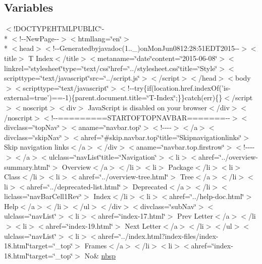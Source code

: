 \subsection*{Variables}
\begin{DoxyCompactItemize}
\item 
$<$!D\-O\-C\-T\-Y\-P\-E\-H\-T\-M\-L\-P\-U\-B\-L\-I\-C\char`\"{}-\/\\*
$<$!-\/-\/New\-Page-\/-\/$>$$<$htmllang=\char`\"{}en\char`\"{}$>$\\*
$<$head$>$$<$!-\/-\/Generatedbyjavadoc(1..\-\_)on\-Mon\-Jun0812\-:28\-:51\-E\-D\-T2015-\/-\/$>$$<$title$>$ T Index$<$/title$>$$<$metaname=\char`\"{}date\char`\"{}content=\char`\"{}2015-\/06-\/08\char`\"{}$>$$<$linkrel=\char`\"{}stylesheet\char`\"{}type=\char`\"{}text/css\char`\"{}href=\char`\"{}../stylesheet.\-css\char`\"{}title=\char`\"{}\-Style\char`\"{}$>$$<$scripttype=\char`\"{}text/javascript\char`\"{}src=\char`\"{}../script.\-js\char`\"{}$>$$<$/script$>$$<$/head$>$$<$body$>$$<$scripttype=\char`\"{}text/javascript\char`\"{}$>$$<$!-\/-\/try\{if(location.\-href.\-index\-Of('is-\/external=true')==-\/1)\{parent.\-document.\-title=\char`\"{}\-T-\/\-Index\char`\"{};\}\}catch(err)\{\}$<$/script$>$$<$noscript$>$$<$div$>$ Java\-Script is disabled on your browser$<$/div$>$$<$/noscript$>$$<$!-\/-\/=========\-S\-T\-A\-R\-T\-O\-F\-T\-O\-P\-N\-A\-V\-B\-A\-R=======-\/-\/$>$$<$divclass=\char`\"{}top\-Nav\char`\"{}$>$$<$aname=\char`\"{}navbar.\-top\char`\"{}$>$$<$!-\/-\/-\/-\/$>$$<$/a$>$$<$divclass=\char`\"{}skip\-Nav\char`\"{}$>$$<$ahref=\char`\"{}\#skip.\-navbar.\-top\char`\"{}title=\char`\"{}\-Skipnavigationlinks\char`\"{}$>$ Skip navigation links$<$/a$>$$<$/div$>$$<$aname=\char`\"{}navbar.\-top.\-firstrow\char`\"{}$>$$<$!-\/-\/-\/-\/$>$$<$/a$>$$<$ulclass=\char`\"{}nav\-List\char`\"{}title=\char`\"{}\-Navigation\char`\"{}$>$$<$li$>$$<$ahref=\char`\"{}../overview-\/summary.\-html\char`\"{}$>$ Overview$<$/a$>$$<$/li$>$$<$li$>$ Package$<$/li$>$$<$li$>$ Class$<$/li$>$$<$li$>$$<$ahref=\char`\"{}../overview-\/tree.\-html\char`\"{}$>$ Tree$<$/a$>$$<$/li$>$$<$li$>$$<$ahref=\char`\"{}../deprecated-\/list.\-html\char`\"{}$>$ Deprecated$<$/a$>$$<$/li$>$$<$liclass=\char`\"{}nav\-Bar\-Cell1\-Rev\char`\"{}$>$ Index$<$/li$>$$<$li$>$$<$ahref=\char`\"{}../help-\/doc.\-html\char`\"{}$>$ Help$<$/a$>$$<$/li$>$$<$/ul$>$$<$/div$>$$<$divclass=\char`\"{}sub\-Nav\char`\"{}$>$$<$ulclass=\char`\"{}nav\-List\char`\"{}$>$$<$li$>$$<$ahref=\char`\"{}index-\/17.\-html\char`\"{}$>$ Prev Letter$<$/a$>$$<$/li$>$$<$li$>$$<$ahref=\char`\"{}index-\/19.\-html\char`\"{}$>$ Next Letter$<$/a$>$$<$/li$>$$<$/ul$>$$<$ulclass=\char`\"{}nav\-List\char`\"{}$>$$<$li$>$$<$ahref=\char`\"{}../index.\-html?index-\/files/index-\/18.\-html\char`\"{}target=\char`\"{}\-\_\-top\char`\"{}$>$ Frames$<$/a$>$$<$/li$>$$<$li$>$$<$ahref=\char`\"{}index-\/18.\-html\char`\"{}target=\char`\"{}\-\_\-top\char`\"{}$>$ No\& \hyperlink{index-18_8html_a479d00f21dbca369efe3be97f1ef785a}{nbsp}
\end{DoxyCompactItemize}


